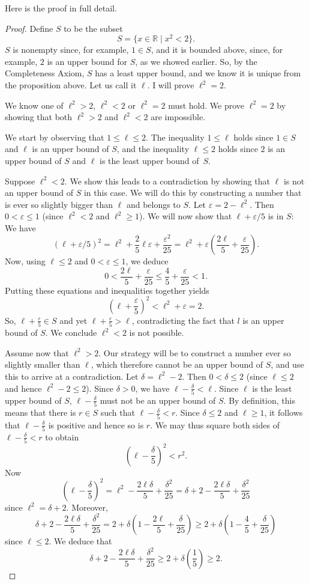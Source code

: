 \documentclass[12pt]{amsart}
\def\d{\delta}
\def\e{\varepsilon}
\newcommand{\R}{{\mathbb{R}}}
\numberwithin{equation}{section}
\theoremstyle{plain} %
\theoremstyle{definition}
\theoremstyle{remark}
\begin{document}
\begin{framed} Here is the proof in full detail.

\begin{proof} 
Define $S$ to be the subset 
$$
S = \{x \in \R \mid x^2 < 2\}.
$$
$S$ is nonempty since, for example, $1 \in S$, and it is bounded above, since, for example, 
$2$ is an upper bound for $S$, as we showed earlier.  So, by the Completeness Axiom, $S$ has a least upper bound, and we know it is unique from
  the proposition above. Let us call it $\ell$. I will prove $\ell^2 = 2$. 


We know one of $\ell^2 > 2$, $\ell^2 < 2$ or $\ell^2 = 2$ must hold. We prove $\ell^2 = 2$ by showing that both
$\ell^2 > 2$ and $\ell^2 < 2$ are impossible.

We start by observing that $1 \leq \ell \leq 2$. The inequality $1 \leq \ell$ holds since $1 \in S$ and $\ell$ is an upper bound of $S$, 
and the inequality $\ell \leq 2$ holds  since $2$ is an upper bound of $S$ and $\ell$ is the least upper bound of~$S$.



Suppose $\ell^2 < 2$. We show this leads to a contradiction by showing that $\ell$ is not an upper bound of $S$ in this case. We will do this by constructing a number
that is ever so slightly bigger than $\ell$ and  belongs to $S$. 
Let $\e = 2 - \ell^2$. Then $0 < \e \leq 1$ (since $\ell^2 < 2$ and $\ell^2 \geq 1$).  
We will now show that $\ell + \e/5$ is in $S$: We have
$$
(\ell + \e/5)^2 = \ell^2 + \frac25 \ell\e + \frac{\e^2}{25} = \ell^2 + \e(\frac{2\ell}{5} + \frac{\e}{25}).
$$
Now, using $\ell \leq 2$ and $0 < \e \leq 1$, we deduce
$$
0 < \frac{2\ell}{5} + \frac{\e}{25} \leq \frac45 + \frac{\e}{25} < 1.
$$
Putting these equations and inequalities  together yields
$$
(\ell + \frac{\e}{5})^2 < \ell^2 + \e = 2.
$$
So, $\ell + \frac{\e}{5} \in S$ and yet $\ell + \frac{\e}{5} > \ell$, contradicting the fact that $l$ is an upper bound of $S$. We conclude $\ell^2 < 2$ is not
possible.

Assume now that $\ell^2 > 2$. Our strategy will be to construct a number ever so slightly smaller than $\ell$, which therefore cannot be an upper bound of $S$, and use this to
arrive at a contradiction. 
Let $\d = \ell^2 - 2$. Then $0 < \d \leq 2$ (since $\ell \leq 2$ and hence $\ell^2 - 2 \leq 2$).
Since $\d > 0$, we have $\ell - \frac{\d}{5} < \ell$. Since $\ell$ is the least upper bound of $S$, $\ell- \frac{\d}{5}$ must not be an upper bound of $S$. By definition, this means that there is $r \in S$ such that 
$\ell - \frac{\d}{5} < r$. Since $\d \leq 2$ and $\ell \geq 1$, it follows that $\ell - \frac{\d}{5}$ is positive and hence so is $r$. We may thus square both sides of 
$\ell - \frac{\d}{5} < r$ to obtain
$$
(\ell - \frac{\d}{5})^2 < r^2.
$$
Now
$$
(\ell - \frac{\d}{5})^2 = \ell^2 - \frac{2\ell\d}{5} + \frac{\d^2}{25} = \d + 2 - \frac{2\ell\d}{5} + \frac{\d^2}{25}
$$
since $\ell^2 = \d + 2$.
Moreover, 
$$
\d + 2 - \frac{2\ell\d}{5} + \frac{\d^2}{25}
= 2 + \d(1 - \frac{2\ell}{5} + \frac{\d}{25})
\geq 2 + \d(1 - \frac{4}{5} + \frac{\d}{25})
$$
since $\ell \leq 2$. We deduce that 
$$
\d + 2 - \frac{2\ell\d}{5} + \frac{\d^2}{25}
\geq 2 + \d(\frac{1}{5}) \geq 2. 
$$


\end{proof}
\end{framed}
\end{document}
